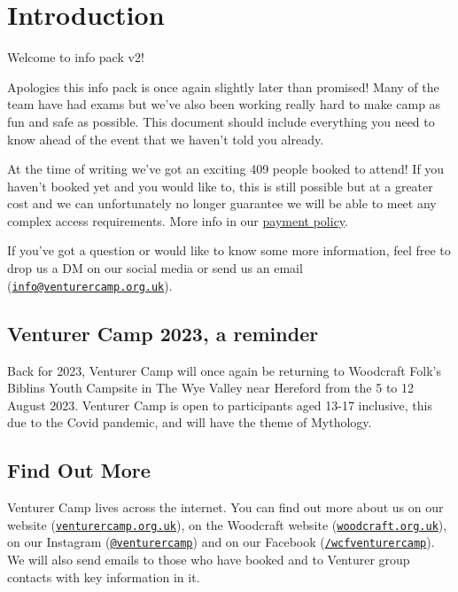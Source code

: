 \documentclass[a4paper, 11pt]{report}
\makeatletter
\newcommand{\nl}{\newline}
\newcommand{\infoemail}{\href{mailto:info@venturercamp.org.uk}{\texttt{info@venturercamp.org.uk}}}
\makeatother
\begin{document}
\tableofcontents
\chapter{Introduction}
Welcome to info pack v2!\nl

Apologies this info pack is once again slightly later than promised! Many of the team have had exams but we've also been working really hard to make camp as fun and safe as possible. This document should include everything you need to know ahead of the event that we haven't told you already.\nl 

At the time of writing we've got an exciting 409 people booked to attend! If you haven't booked yet and you would like to, this is still possible but at a greater cost and we can unfortunately no longer guarantee we will be able to meet any complex access requirements. More info in our \href{https://venturercamp.org.uk/wp-content/uploads/2023/05/payment-policy-v2.pdf}{payment policy}.\nl

If you've got a question or would like to know some more information, feel free to drop us a DM on our social media or send us an email (\infoemail).

\section{Venturer Camp 2023, a reminder}
Back for 2023, Venturer Camp will once again be returning to Woodcraft Folk's Biblins Youth Campsite in The Wye Valley near Hereford from the 5 to 12 August 2023. Venturer Camp is open to participants aged 13-17 inclusive, this due to the Covid pandemic, and will have the theme of Mythology.

\section{Find Out More}
Venturer Camp lives across the internet. You can find out more about us on our website (\href{https://venturercamp.org.uk}{\texttt{venturercamp.org.uk}}), on the Woodcraft website (\href{https://woodcraft.org.uk}{\texttt{woodcraft.org.uk}}), on our Instagram (\href{https://www.instagram.com/venturercamp/}{\texttt{@venturercamp}}) and on our Facebook (\href{https://www.facebook.com/wcfventurercamp}{\texttt{/wcfventurercamp}}).
We will also send emails to those who have booked and to Venturer group contacts with key information in it.
\end{document}
